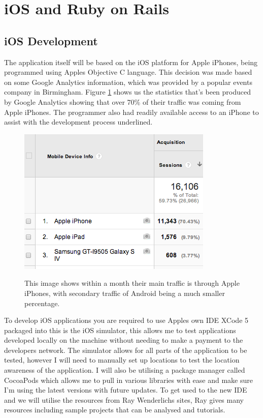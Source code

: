 \section{iOS and Ruby on Rails}

	\subsection{iOS Development}
	The application itself will be based on the iOS platform for Apple iPhones, being programmed using Apples Objective C language. This decision was made based on some Google Analytics information, which was provided by a popular events company in Birmingham. Figure \ref{fig:googleAnalyticsRainbow} shows us the statistics that's been produced by Google Analytics showing that over 70\% of their traffic was coming from Apple iPhones. The programmer also had readily available access to an iPhone to assist with the development process underlined. 

	\begin{figure}[h] %
		\caption[Image of Google Analytics for popular events site]{This image shows within a month their main traffic is through Apple iPhones, with secondary traffic of Android being a much smaller percentage. }
		\centering
		\includegraphics[scale=1]{Images/google-analytics}
		\label{fig:googleAnalyticsRainbow}
	\end{figure}

	To develop iOS applications you are required to use Apples own IDE XCode 5 packaged into this is the iOS simulator, this allows me to test applications developed locally on the machine without needing to make a payment to the developers network. The simulator allows for all parts of the application to be tested, however I will need to manually set up locations to test the location awareness of the application. I will also be utilising a package manager called CocoaPods \cite{cocoapods} which allows me to pull in various libraries with ease and make sure I'm using the latest versions with future updates. To get used to the new IDE and we will utilise the resources from Ray Wenderlichs sites\cite{raywender}, Ray gives many resources including sample projects that can be analysed and tutorials.  


